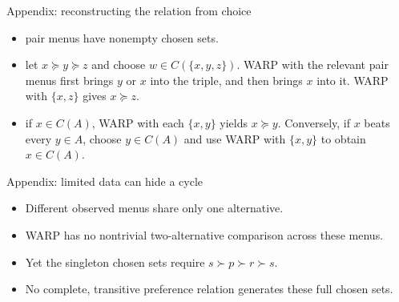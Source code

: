 \documentclass[handout,aspectratio=169,10pt]{beamer}
\begin{document}
\begin{frame}[label=proof-equivalence]{Appendix: reconstructing the relation from choice}
\small
{}

\begin{itemize}
\item {} pair menus have nonempty chosen sets.
\item {} let $x\succeq y\succeq z$ and choose $w\in C(\{x,y,z\})$. WARP with the relevant pair menus first brings $y$ or $x$ into the triple, and then brings $x$ into it. WARP with $\{x,z\}$ gives $x\succeq z$.
\item {} if $x\in C(A)$, WARP with each $\{x,y\}$ yields $x\succeq y$. Conversely, if $x$ beats every $y\in A$, choose $y\in C(A)$ and use WARP with $\{x,y\}$ to obtain $x\in C(A)$.
\end{itemize}

\vfill{}
\end{frame}

\begin{frame}[label=proof-limited-data]{Appendix: limited data can hide a cycle}

\uncover<+->{\[
C(\{s,p\})=\{s\},\qquad C(\{p,r\})=\{p\},\qquad C(\{s,r\})=\{r\}.
\]}

\begin{itemize}
\item Different observed menus share only one alternative.
\item WARP has no nontrivial two-alternative comparison across these menus.
\item Yet the singleton chosen sets require $s\succ p\succ r\succ s$.
\item No complete, transitive preference relation generates these full chosen sets.
\end{itemize}

\vfill{}
\end{frame}
\end{document}
